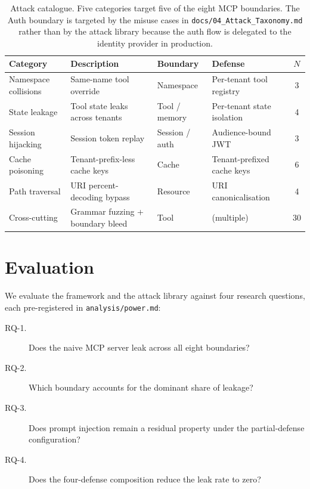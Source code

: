 \documentclass[sigconf, anonymous, natbib=false]{acmart}
\begin{document}
\begin{table}[t]
\caption{Attack catalogue. Five categories target five of
the eight MCP boundaries. The Auth boundary is targeted by
the misuse cases in \texttt{docs/04\_Attack\_Taxonomy.md}
rather than by the attack library because the auth flow is
delegated to the identity provider in production.}
\label{tab:attacks}
\centering
\small
\begin{tabularx}{\linewidth}{l X l X c}
\toprule
Category & Description & Boundary & Defense & $N$ \\
\midrule
Namespace collisions
        & Same-name tool override
        & Namespace
        & Per-tenant tool registry
        & 3 \\
State leakage
        & Tool state leaks across tenants
        & Tool / memory
        & Per-tenant state isolation
        & 4 \\
Session hijacking
        & Session token replay
        & Session / auth
        & Audience-bound JWT
        & 3 \\
Cache poisoning
        & Tenant-prefix-less cache keys
        & Cache
        & Tenant-prefixed cache keys
        & 6 \\
Path traversal
        & URI percent-decoding bypass
        & Resource
        & URI canonicalisation
        & 4 \\
\midrule
Cross-cutting
        & Grammar fuzzing + boundary bleed
        & Tool
        & (multiple)
        & 30 \\
\bottomrule
\end{tabularx}
\end{table}

\section{Evaluation}\label{sec:evaluation}

We evaluate the framework and the attack library against
four research questions, each pre-registered in
\texttt{analysis/power.md}:

\begin{description}
  \item[RQ-1.] Does the naive MCP server leak across all
        eight boundaries?
  \item[RQ-2.] Which boundary accounts for the dominant
        share of leakage?
  \item[RQ-3.] Does prompt injection remain a residual
        property under the partial-defense configuration?
  \item[RQ-4.] Does the four-defense composition reduce
        the leak rate to zero?
\end{description}
\end{document}
